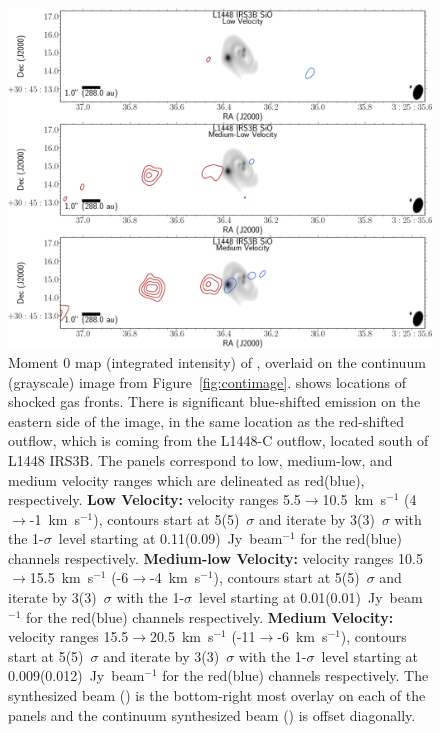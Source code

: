 \begin{figure}[H]
   \begin{center}
   \includegraphics[width=\textwidth]{img/L1448IRS3B_SiO_image_taper1500k__panel1.pdf} %
   \end{center}
   \caption{Moment 0 map (integrated intensity) of \sio, overlaid on the continuum (grayscale) image from Figure~\ref{fig:contimage}. \sio\space shows locations of shocked gas fronts. There is significant blue-shifted emission on the eastern side of the image, in the same location as the red-shifted outflow, which is coming from the L1448-C outflow, located \arcmin south of L1448 IRS3B. The panels correspond to low, medium-low, and medium velocity ranges which are delineated as red(blue), respectively. \textbf{Low Velocity:} velocity ranges 5.5$\rightarrow$10.5~km~s$^{-1}$ (4$\rightarrow$-1~km~s$^{-1}$), contours start at 5(5)~$\sigma$ and iterate by 3(3)~$\sigma$ with the 1-$\sigma$~level starting at 0.11(0.09)~Jy~beam$^{-1}$ for the red(blue) channels respectively. \textbf{Medium-low Velocity:} velocity ranges 10.5$\rightarrow$15.5~km~s$^{-1}$ (-6$\rightarrow$-4~km~s$^{-1}$), contours start at 5(5)~$\sigma$ and iterate by 3(3)~$\sigma$ with the 1-$\sigma$~level starting at 0.01(0.01)~Jy~beam$^{-1}$ for the red(blue) channels respectively. \textbf{Medium Velocity:} velocity ranges 15.5$\rightarrow$20.5~km~s$^{-1}$ (-11$\rightarrow$-6~km~s$^{-1}$), contours start at 5(5)~$\sigma$ and iterate by 3(3)~$\sigma$ with the 1-$\sigma$~level starting at 0.009(0.012)~Jy~beam$^{-1}$ for the red(blue) channels respectively. The \sio\space synthesized beam (\siobeam) is the bottom-right most overlay on each of the panels and the continuum synthesized beam (\contbeam) is offset diagonally.}\label{fig:siomomentmap}
\end{figure}


